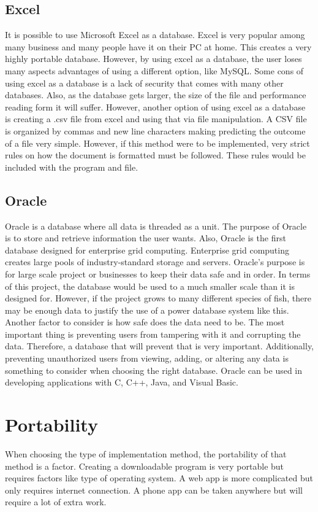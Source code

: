 \documentclass[onecolumn, draftclsnofoot,10pt, compsoc]{IEEEtran}
\begin{document}
    \subsection{Excel}
    It is possible to use Microsoft Excel as a database. Excel is very popular among many business and many people have it on their PC at home. This creates a very highly portable database. However, by using excel as a database, the user loses many aspects advantages of using a different option, like MySQL. Some cons of using excel as a database is a lack of security that comes with many other databases. Also, as the database gets larger, the size of the file and performance reading form it will suffer\cite{excelsite}. However, another option of using excel as a database is creating a .csv file from excel and using that via file manipulation. A CSV file is organized by commas and new line characters making predicting the outcome of a file very simple. However, if this method were to be implemented, very strict rules on how the document is formatted must be followed. These rules would be included with the program and file.
    
    \subsection{Oracle}
    Oracle is a database where all data is threaded as a unit. The purpose of Oracle is to store and retrieve information the user wants. Also, Oracle is the first database designed for enterprise grid computing. Enterprise grid computing creates large pools of industry-standard storage and servers. Oracle's purpose is for large scale project or businesses to keep their data safe and in order. In terms of this project, the database would be used to a much smaller scale than it is designed for. However, if the project grows to many different species of fish, there may be enough data to justify the use of a power database system like this. Another factor to consider is how safe does the data need to be. The most important thing is preventing users from tampering with it and corrupting the data. Therefore, a database that will prevent that is very important. Additionally, preventing unauthorized users from viewing, adding, or altering any data is something to consider when choosing the right database. Oracle can be used in developing applications with C, C++, Java, and Visual Basic\cite{oraclesite}.
    
\section{Portability}
When choosing the type of implementation method, the portability of that method is a factor. Creating a downloadable program is very portable but requires factors like type of operating system. A web app is more complicated but only requires internet connection. A phone app can be taken anywhere but will require a lot of extra work.
\end{document}
